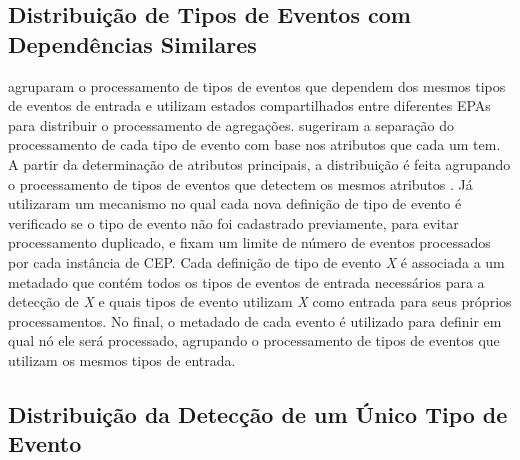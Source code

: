 \subsection{{Distribuição de Tipos de Eventos com Dependências Similares}}
\label{sec:similarDep}
\cite{Isoyama:2012:SCE:2335484.2335498} agruparam o processamento de tipos de eventos que dependem dos mesmos tipos de eventos de entrada e utilizam estados compartilhados entre diferentes EPAs para distribuir o processamento de agregações. \cite{Kobayashi:2015:CEP:2675743.2776771} sugeriram a separação do processamento de cada tipo de evento com base nos atributos que cada um tem. A partir da determinação de atributos principais, a distribuição é feita agrupando o processamento de tipos de eventos que detectem os mesmos atributos%
. Já \cite{7129184} utilizaram um mecanismo no qual cada nova definição de tipo de evento é verificado se o tipo de evento não foi cadastrado previamente, para evitar processamento duplicado, e fixam um limite de número de eventos processados por cada instância de CEP. Cada definição de tipo de evento \textit{X} é associada a um metadado que contém todos os tipos de eventos de entrada necessários para a detecção de \textit{X} e quais tipos de evento utilizam \textit{X} como entrada para seus próprios processamentos. No final, o metadado de cada evento é utilizado para definir em qual nó ele será processado, agrupando o processamento de tipos de eventos que utilizam os mesmos tipos de entrada.%







\subsection{{Distribuição da Detecção de um Único Tipo de Evento}}
\label{sec:singleEvent}

